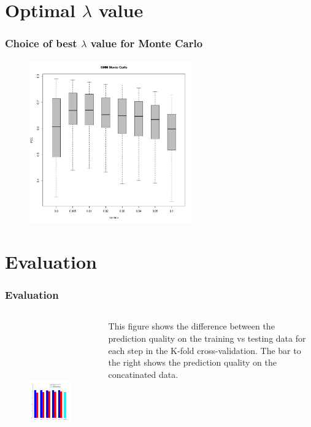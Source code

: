\documentclass[presentation]{beamer}   %
\begin{document}
\section{Optimal $\lambda$ value}
\begin{frame}
  \frametitle{Choice of best $\lambda$ value for Monte Carlo}
	\begin{figure}
		\centering
		\includegraphics[width=70mm,height=70mm]{fig/choice_lambda_mc.pdf}
	\end{figure}
\end{frame}

\section{Evaluation}
\begin{frame}
  \frametitle{Evaluation}
  \begin{columns}[t] %
		\begin{figure}
		\centering
			\includegraphics[width=70mm,height=70mm]{fig/barplot.pdf}
		\end{figure}
		\centering
		\begin{block}\centering
		This figure shows the difference between the prediction quality on the training vs testing data for each step in the K-fold cross-validation. The bar to the right shows the prediction quality on the concatinated data.
		\end{block}
  \end{columns}
\end{frame}
\end{document}
